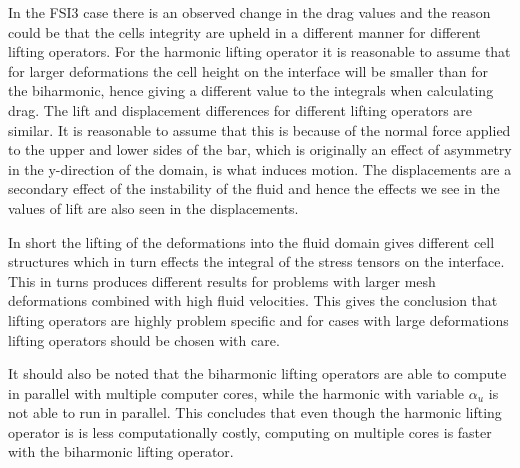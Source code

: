 In the FSI3 case there is an observed change in the drag values and the reason could be that the cells integrity are upheld in a different manner for different lifting operators. For the harmonic lifting operator it is reasonable to assume that for larger deformations the cell height on the interface will be smaller than for the biharmonic, hence giving a different value to the integrals when calculating drag. The lift and displacement differences for different lifting operators are similar. It is reasonable to assume that this is because of the normal force applied to the upper and lower sides of the bar, which is originally an effect of asymmetry in the y-direction of the domain, is what induces motion. The displacements are a secondary effect of the instability of the fluid and hence the effects we see in the values of lift are also seen in the displacements.

In short the lifting of the deformations into the fluid domain gives different cell structures which in turn effects the integral of the stress tensors on the interface. This in turns produces different results for problems with larger mesh deformations combined with high fluid velocities. This gives the conclusion that lifting operators are highly problem specific and for cases with large deformations lifting operators should be chosen with care.

It should also be noted that the biharmonic lifting operators are able to compute in parallel with multiple computer cores, while the harmonic with variable $\alpha_u$ is not able to run in parallel. This concludes that even though the harmonic lifting operator is is less computationally costly, computing on multiple cores is faster with the biharmonic lifting operator.






